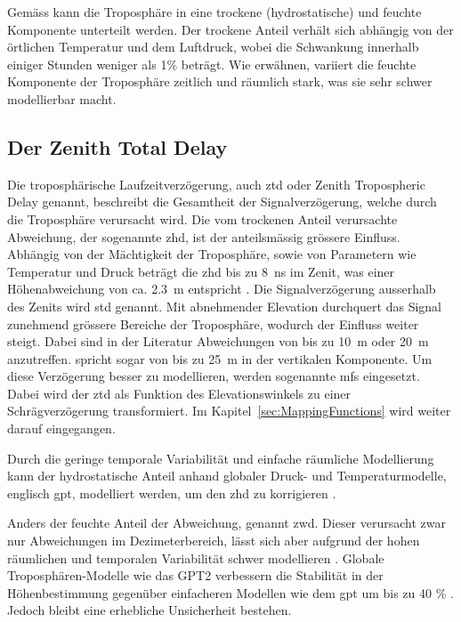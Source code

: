 Gemäss \textcite[S. 122]{subiranaGNSSDataProcessing2013} kann die Troposphäre in eine trockene (hydrostatische) und feuchte Komponente unterteilt werden.
Der trockene Anteil verhält sich abhängig von der örtlichen Temperatur und dem Luftdruck, 
wobei die Schwankung innerhalb einiger Stunden weniger als 1\% beträgt. 
Wie \citeauthor{subiranaGNSSDataProcessing2013} erwähnen, variiert die feuchte Komponente der Troposphäre zeitlich und räumlich stark,
was sie sehr schwer modellierbar macht.



\subsection{Der Zenith Total Delay}
Die troposphärische Laufzeitverzögerung, auch \gls{ztd} oder Zenith Tropospheric Delay genannt,
beschreibt die Gesamtheit der Signalverzögerung, welche durch die Troposphäre verursacht wird. 
Die vom trockenen Anteil verursachte Abweichung, der sogenannte \gls{zhd}, ist der anteilsmässig grössere Einfluss.
Abhängig von der Mächtigkeit der Troposphäre, sowie von Parametern wie Temperatur und Druck 
beträgt die \gls{zhd} bis zu 8~ns im Zenit, was einer Höhenabweichung von ca. 2.3~m entspricht \parencite[S. 122]{subiranaGNSSDataProcessing2013}.
Die Signalverzögerung ausserhalb des Zenits wird \gls{std} genannt.
Mit abnehmender Elevation durchquert das Signal zunehmend grössere Bereiche der Troposphäre, wodurch der Einfluss weiter steigt.
Dabei sind in der Literatur Abweichungen von bis zu 10~m \parencite[S. 122]{subiranaGNSSDataProcessing2013} oder 20~m \parencite{liUnravelingAccuracyEnigma2024} 
anzutreffen. \textcite[S. 47]{klaffenboeckTroposphaerischeLaufzeitverzoegerungGNSSSignalen2005} spricht sogar von bis zu 25~m in der vertikalen Komponente.
Um diese Verzögerung besser zu modellieren, werden sogenannte \glspl{mf} eingesetzt.
Dabei wird der \gls{ztd} als Funktion des Elevationswinkels zu einer Schrägverzögerung transformiert.
Im Kapitel~\ref{sec:MappingFunctions} wird weiter darauf eingegangen.

Durch die geringe temporale Variabilität und einfache räumliche Modellierung kann der hydrostatische Anteil anhand globaler 
Druck- und Temperaturmodelle, englisch \gls{gpt}, modelliert werden, um den \gls{zhd} zu korrigieren \parencite{boehmShortNoteGlobal2007}. %

Anders der feuchte Anteil der Abweichung, genannt \gls{zwd}. Dieser verursacht zwar nur Abweichungen im Dezimeterbereich, 
lässt sich aber aufgrund der hohen räumlichen und temporalen Variabilität schwer modellieren \parencite[S. 29]{aichinger-rosenbergerTroposphericDelayParameters2021}. 
Globale Troposphären-Modelle wie das GPT2 verbessern die Stabilität in der Höhenbestimmung gegenüber einfacheren Modellen wie dem \gls{gpt} 
um bis zu 40 \% \parencite{laglerGPT2EmpiricalSlant2013}. Jedoch bleibt eine erhebliche Unsicherheit bestehen.

